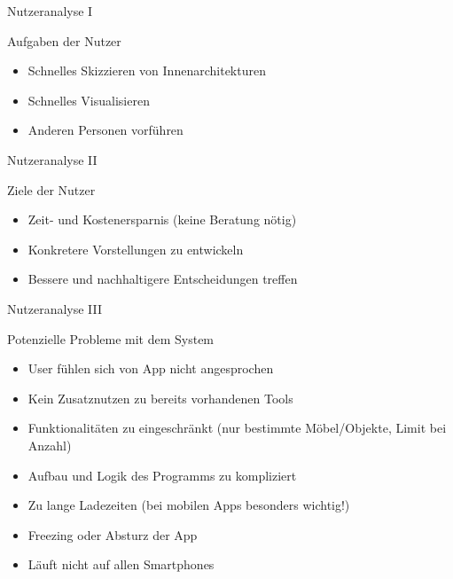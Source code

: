 \documentclass[presentation,bigger,aspectratio=169]{beamer}
\begin{document}
\begin{frame}[label={sec:org31f71e0}]{Nutzeranalyse I}
\begin{block}{Aufgaben der Nutzer}
\begin{itemize}
\item Schnelles Skizzieren von Innenarchitekturen
\item Schnelles Visualisieren
\item Anderen Personen vorführen
\end{itemize}
\end{block}
\end{frame}
\begin{frame}[label={sec:org16abd57}]{Nutzeranalyse II}
\begin{block}{Ziele der Nutzer}
\begin{itemize}
\item Zeit- und Kostenersparnis (keine Beratung nötig)
\item Konkretere Vorstellungen zu entwickeln
\item Bessere und nachhaltigere Entscheidungen treffen
\end{itemize}
\end{block}
\end{frame}

\begin{frame}[label={sec:orge789eaf}]{Nutzeranalyse III}
\begin{block}{Potenzielle Probleme mit dem System}
\begin{itemize}
\item User fühlen sich von App nicht angesprochen
\item Kein Zusatznutzen zu bereits vorhandenen Tools
\item Funktionalitäten zu eingeschränkt (nur bestimmte Möbel/Objekte,
Limit bei Anzahl)
\item Aufbau und Logik des Programms zu kompliziert
\item Zu lange Ladezeiten (bei mobilen Apps besonders wichtig!)
\item Freezing oder Absturz der App
\item Läuft nicht auf allen Smartphones
\end{itemize}
\end{block}
\end{frame}
\end{document}
